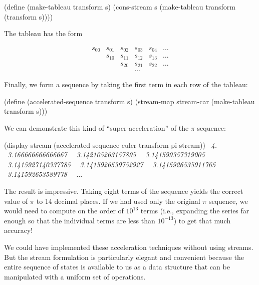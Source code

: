 \begin{codeBlock}
(define (make-tableau transform s)
  (cons-stream s (make-tableau transform (transform s))))
\end{codeBlock}

\noindent
The tableau has the form

\[
\begin{matrix}
s_{00} & s_{01} & s_{02} & s_{03} & s_{04} & \dots \\
       & s_{10} & s_{11} & s_{12} & s_{13} & \dots \\
       &        & s_{20} & s_{21} & s_{22} & \dots \\
       &        &        & \dots  &        & 
\end{matrix}
\]

Finally, we form a sequence by taking the first term in each row of the
tableau:

\begin{codeBlock}
(define (accelerated-sequence transform s)
  (stream-map stream-car (make-tableau transform s)))
\end{codeBlock}

\noindent
We can demonstrate this kind of ``super-acceleration'' of the \( \pi \)
sequence:

\begin{codeBlock}
(display-stream
 (accelerated-sequence euler-transform pi-stream))
~\textit{4.}~
~\textit{3.166666666666667}~
~\textit{3.142105263157895}~
~\textit{3.141599357319005}~
~\textit{3.1415927140337785}~
~\textit{3.1415926539752927}~
~\textit{3.1415926535911765}~
~\textit{3.141592653589778}~
~\( \dots \)~
\end{codeBlock}

\noindent
The result is impressive.  Taking eight terms of the sequence yields the
correct value of \( \pi \) to 14 decimal places.  If we had used only the
original \( \pi \) sequence, we would need to compute on the order of \( 10^{13} \)
terms (i.e., expanding the series far enough so that the individual terms are
less than \( 10^{-13} \)) to get that much accuracy!

We could have implemented these acceleration techniques without using streams.
But the stream formulation is particularly elegant and convenient because the
entire sequence of states is available to us as a data structure that can be
manipulated with a uniform set of operations.

